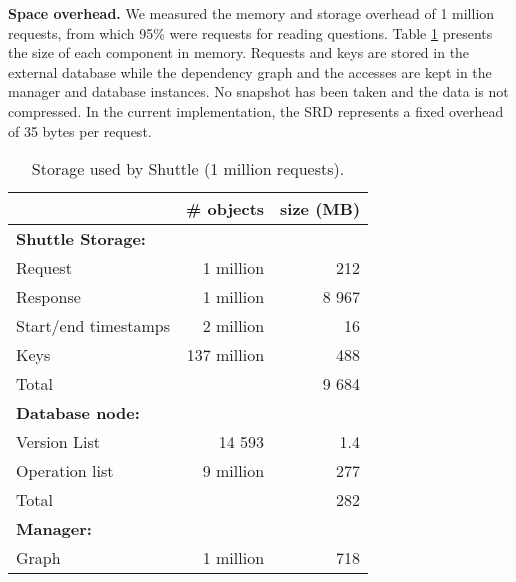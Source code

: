 \textbf{Space overhead.}
We measured the memory and storage overhead of 1 million requests, from which 95\% were requests for reading questions. Table \ref{tab:storage_overhead} presents the size of each component in memory. Requests and keys are stored in the external database while the dependency graph and the accesses are kept in the manager and database instances. No snapshot has been taken and the data is not compressed.
%
In the current implementation, the \ac{SRD} represents a fixed overhead of 35 bytes per request.

\begin{table}[h]
\centering
\footnotesize
  \begin{tabular}{l|rr}
                & \# objects & size (MB) \\ \hline
  \textbf{Shuttle Storage: }      \\
  Request         & 1 million    & 212       \\  %
  Response        & 1 million    & 8 967     \\  %
  Start/end timestamps      & 2 million    & 16        \\  %
  Keys            & 137 million  & 488       \\  %
  Total           &              & 9 684     \\  %
  \textbf{Database node:}        &           \\
  Version List    &  14 593      &  1.4       \\ %
  Operation list  &  9 million   &  277       \\ %
  Total           &              & 282 \\ %
  \textbf{Manager:} & & \\ 
  Graph           & 1 million    & 718 \\  %
  \end{tabular}            
\caption{Storage used by Shuttle  (1 million requests).}
\label{tab:storage_overhead}
\vspace{-5mm}
\end{table}


